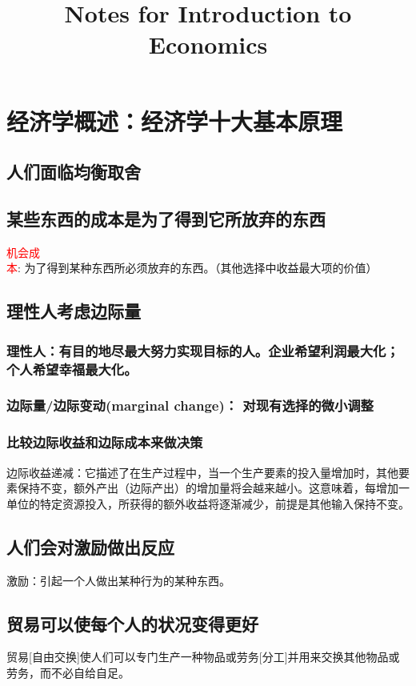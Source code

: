 \documentclass[12pt,a4paper]{article}
\title{Notes for Introduction to Economics}
\author{}
\date{}
\begin{document}
\onehalfspacing
\maketitle
\vspace{-3em} %


\section{经济学概述：经济学十大基本原理}

\subsection{人们面临均衡取舍}

\subsection{某些东西的成本是为了得到它所放弃的东西}
\textcolor{red}{机会成本}: 为了得到某种东西所必须放弃的东西。（其他选择中收益最大项的价值）

\subsection{理性人考虑边际量}
\subsubsection{理性人：有目的地尽最大努力实现目标的人。企业希望利润最大化；个人希望幸福最大化。}
\subsubsection{边际量/边际变动(marginal change)： 对现有选择的微小调整}
\subsubsection{比较边际收益和边际成本来做决策}
边际收益递减：它描述了在生产过程中，当一个生产要素的投入量增加时，其他要素保持不变，额外产出（边际产出）的增加量将会越来越小。这意味着，每增加一单位的特定资源投入，所获得的额外收益将逐渐减少，前提是其他输入保持不变。
\subsection{人们会对激励做出反应}
激励：引起一个人做出某种行为的某种东西。
\subsection{贸易可以使每个人的状况变得更好}
贸易[自由交换]使人们可以专门生产一种物品或劳务[分工]并用来交换其他物品或劳务，而不必自给自足。
\end{document}
